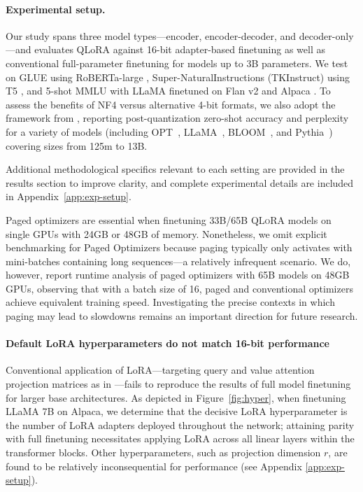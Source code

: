 \paragraph{Experimental setup.} Our study spans three model types—encoder, encoder-decoder, and decoder-only—and evaluates QLoRA against 16-bit adapter-based finetuning as well as conventional full-parameter finetuning for models up to 3B parameters. We test on GLUE \citep{wang2018glue} using RoBERTa-large \citep{liu2019roberta}, Super-NaturalInstructions (TKInstruct) \citep{wang2022super} using T5 \citep{t5}, and 5-shot MMLU \citep{hendrycksmeasuring} with LLaMA finetuned on Flan v2 \citep{longpre2023flan} and Alpaca \citep{alpaca}. To assess the benefits of NF4 versus alternative 4-bit formats, we also adopt the framework from \citet{dettmers2022case}, reporting post-quantization zero-shot accuracy and perplexity for a variety of models (including OPT~\citep{zhang2022opt}, LLaMA~\citep{touvron2023llama}, BLOOM~\citep{scao2022bloom}, and Pythia~\citep{biderman2023pythia}) covering sizes from 125m to 13B.

Additional methodological specifics relevant to each setting are provided in the results section to improve clarity, and complete experimental details are included in Appendix~\ref{app:exp-setup}.

Paged optimizers are essential when finetuning 33B/65B \textsc{QLoRA} models on single GPUs with 24GB or 48GB of memory. Nonetheless, we omit explicit benchmarking for Paged Optimizers because paging typically only activates with mini-batches containing long sequences—a relatively infrequent scenario. We do, however, report runtime analysis of paged optimizers with 65B models on 48GB GPUs, observing that with a batch size of 16, paged and conventional optimizers achieve equivalent training speed. Investigating the precise contexts in which paging may lead to slowdowns remains an important direction for future research.

\paragraph{Default LoRA hyperparameters do not match 16-bit performance} 

Conventional application of LoRA—targeting query and value attention projection matrices as in \citet{hu2021lora}—fails to reproduce the results of full model finetuning for larger base architectures. As depicted in Figure~\ref{fig:hyper}, when finetuning LLaMA 7B on Alpaca, we determine that the decisive LoRA hyperparameter is the number of LoRA adapters deployed throughout the network; attaining parity with full finetuning necessitates applying LoRA across all linear layers within the transformer blocks. Other hyperparameters, such as projection dimension $r$, are found to be relatively inconsequential for performance (see Appendix \ref{app:exp-setup}).

